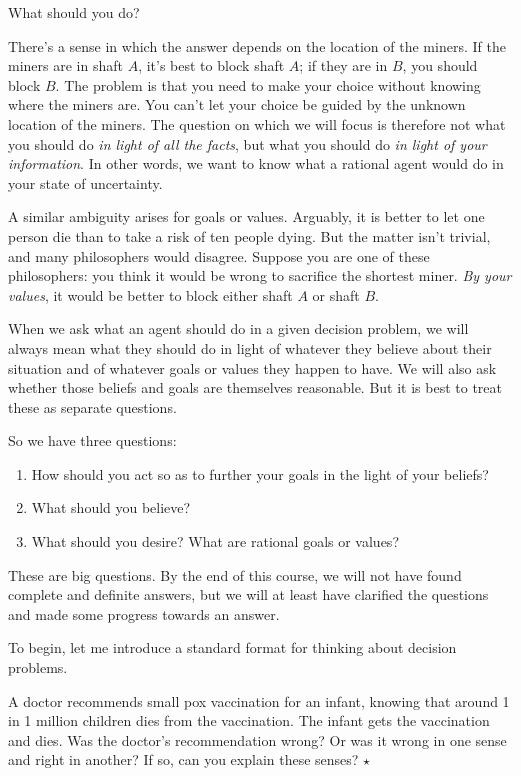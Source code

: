 What should you do?

There's a sense in which the answer depends on the location of the
miners. If the miners are in shaft $A$, it's best to block shaft $A$;
if they are in $B$, you should block $B$. The problem is that you need
to make your choice without knowing where the miners are. You can't
let your choice be guided by the unknown location of the miners. The
question on which we will focus is therefore not what you should do
\emph{in light of all the facts}, but what you should do \emph{in
  light of your information}. In other words, we want to know what a
rational agent would do in your state of uncertainty.

A similar ambiguity arises for goals or values. Arguably, it is better
to let one person die than to take a risk of ten people dying. But the
matter isn't trivial, and many philosophers would disagree. Suppose
you are one of these philosophers: you think it would be wrong to
sacrifice the shortest miner. \emph{By your values}, it would be
better to block either shaft $A$ or shaft $B$.

When we ask what an agent should do in a given decision problem, we
will always mean what they should do in light of whatever they believe
about their situation and of whatever goals or values they happen to
have. We will also ask whether those beliefs and goals are themselves
reasonable. But it is best to treat these as separate questions.

So we have three questions:
\begin{enumerate}
  \itemsep0em 
\item How should you act so as to further your goals in the light of
  your beliefs?
\item What should you believe?
\item What should you desire? What are rational goals or values?
\end{enumerate}
These are big questions. By the end of this course, we will not have
found complete and definite answers, but we will at least have
clarified the questions and made some progress towards an answer.

To begin, let me introduce a standard format for thinking about
decision problems.

\begin{exercise}
  A doctor recommends small pox vaccination for an infant, knowing
  that around 1 in 1 million children dies from the vaccination. The
  infant gets the vaccination and dies. Was the doctor's
  recommendation wrong? Or was it wrong in one sense and right in
  another? If so, can you explain these senses? $\star$
\end{exercise}



